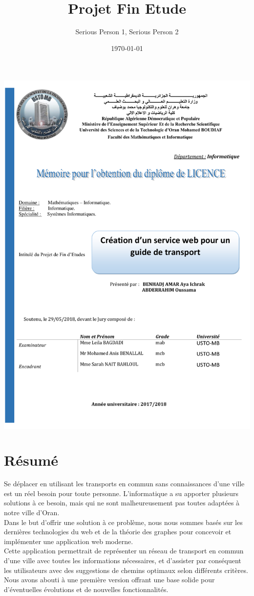 \documentclass[
 a4paper,
12pt,			%
headsepline
]{report}
\title{Projet Fin Etude}
\author{Serious Person 1, Serious Person 2}
\date{\today}
\begin{document}
	

\includegraphics[scale=1]{parts/pagedegarde.pdf}



\chapter*{Résumé} 

Se déplacer en utilisant les transports en commun sans connaissances d'une ville est un réel besoin pour toute personne. L'informatique a su apporter plusieurs solutions à ce besoin, mais qui ne sont malheureusement pas toutes adaptées à notre ville d'Oran.\\
Dans le but d'offrir une solution à ce problème, nous nous sommes basés sur les dernières technologies du web et de la théorie des graphes pour concevoir et implémenter une application web moderne.\\
Cette application permettrait de représenter un réseau de transport en commun d'une ville avec toutes les informations nécessaires, et d'assister par conséquent les utilisateurs avec des suggestions de chemins optimaux selon différents critères.\\
Nous avons abouti à une première version offrant une base solide pour d'éventuelles évolutions et de nouvelles fonctionnalités.
\end{document}
